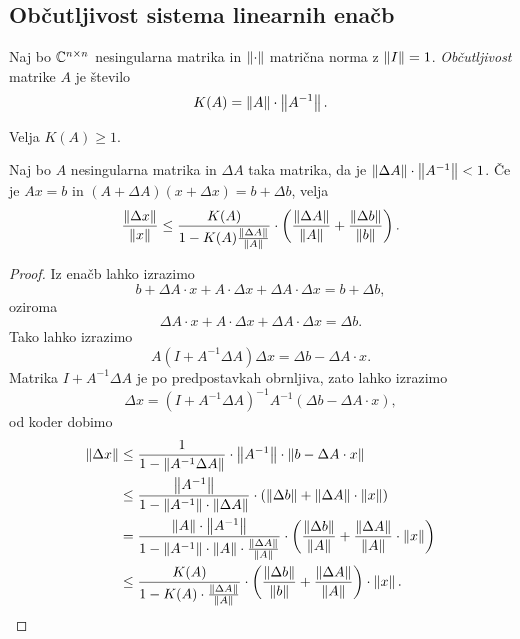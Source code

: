 \newpage

\subsection{Občutljivost sistema linearnih enačb}

\begin{definicija}
Naj bo $\mathbb{C}^{n \times n}$ nesingularna matrika in $\left\lVert \cdot\right\rVert$
matrična norma z $\left\lVert I\right\rVert = 1$.
\emph{Občutljivost} matrike $A$ je
število
\[
K(A) = \left\lVert A\right\rVert \cdot \left\lVert A^{-1}\right\rVert.
\]
\end{definicija}

\begin{opomba}
Velja $K(A) \geq 1$.
\end{opomba}

\begin{izrek}
Naj bo $A$ nesingularna matrika in $\Delta A$ taka matrika, da je
$\left\lVert \Delta A\right\rVert \cdot \left\lVert A^{-1}\right\rVert < 1$. Če je $Ax = b$ in
$(A + \Delta A) (x + \Delta x) = b + \Delta b$, velja
\[
\frac{\left\lVert \Delta x\right\rVert}{\left\lVert x\right\rVert} \leq
\frac{K(A)}{1 - K(A) \frac{\left\lVert \Delta A\right\rVert}{\left\lVert A\right\rVert}} \cdot
\left(\frac{\left\lVert \Delta A\right\rVert}{\left\lVert A\right\rVert} +
\frac{\left\lVert \Delta b\right\rVert}{\left\lVert b\right\rVert}\right).
\]
\end{izrek}

\begin{proof}
Iz enačb lahko izrazimo
\[
b + \Delta A \cdot x + A \cdot \Delta x + \Delta A \cdot \Delta x =
b + \Delta b,
\]
oziroma
\[
\Delta A \cdot x + A \cdot \Delta x + \Delta A \cdot \Delta x =
\Delta b.
\]
Tako lahko izrazimo
\[
A(I + A^{-1} \Delta A) \Delta x = \Delta b - \Delta A \cdot x.
\]
Matrika $I + A^{-1} \Delta A$ je po predpostavkah obrnljiva, zato
lahko izrazimo
\[
\Delta x =
(I + A^{-1} \Delta A)^{-1} A^{-1} (\Delta b - \Delta A \cdot x),
\]
od koder dobimo
\begin{align*}
\left\lVert \Delta x\right\rVert &\leq
\frac{1}{1 - \left\lVert A^{-1} \Delta A\right\rVert} \cdot \left\lVert A^{-1}\right\rVert \cdot
\left\lVert b - \Delta A \cdot x\right\rVert
\\
&\leq
\frac{\left\lVert A^{-1}\right\rVert}{1 - \left\lVert A^{-1}\right\rVert \cdot \left\lVert \Delta A\right\rVert} \cdot
\left(\left\lVert \Delta b\right\rVert + \left\lVert \Delta A\right\rVert \cdot \left\lVert x\right\rVert\right)
\\
&=
\frac{\left\lVert A\right\rVert \cdot \left\lVert A^{-1}\right\rVert}
{1 - \left\lVert A^{-1}\right\rVert \cdot \left\lVert A\right\rVert \cdot
\frac{\left\lVert \Delta A\right\rVert}{\left\lVert A\right\rVert}} \cdot
\left(\frac{\left\lVert \Delta b\right\rVert}{\left\lVert A\right\rVert} +
\frac{\left\lVert \Delta A\right\rVert}{\left\lVert A\right\rVert} \cdot \left\lVert x\right\rVert\right)
\\
&\leq
\frac{K(A)} {1 - K(A) \cdot \frac{\left\lVert \Delta A\right\rVert}{\left\lVert A\right\rVert}} \cdot
\left(\frac{\left\lVert \Delta b\right\rVert}{\left\lVert b\right\rVert} +
\frac{\left\lVert \Delta A\right\rVert}{\left\lVert A\right\rVert}\right) \cdot \left\lVert x\right\rVert. \qedhere
\end{align*}
\end{proof}

